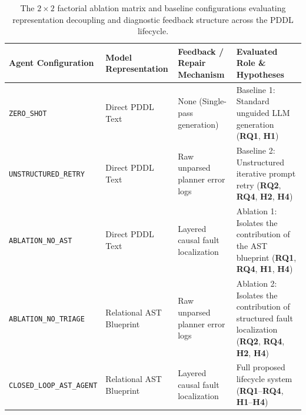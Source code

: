 \documentclass[11pt,a4paper]{article}
\begin{document}
\begin{table}[H]
\centering
\footnotesize
\renewcommand{\arraystretch}{1.1}
\begin{tabularx}{\textwidth}{l p{3.2cm} p{3.8cm} X}
\toprule
\textbf{Agent Configuration} & \textbf{Model Representation} & \textbf{Feedback / Repair Mechanism} & \textbf{Evaluated Role \& Hypotheses} \\
\midrule
\texttt{ZERO\_SHOT} & Direct PDDL Text & None (Single-pass generation) & Baseline 1: Standard unguided LLM generation (\textbf{RQ1}, \textbf{H1}) \\
\texttt{UNSTRUCTURED\_RETRY} & Direct PDDL Text & Raw unparsed planner error logs & Baseline 2: Unstructured iterative prompt retry (\textbf{RQ2}, \textbf{RQ4}, \textbf{H2}, \textbf{H4}) \\
\texttt{ABLATION\_NO\_AST} & Direct PDDL Text & Layered causal fault localization & Ablation 1: Isolates the contribution of the AST blueprint (\textbf{RQ1}, \textbf{RQ4}, \textbf{H1}, \textbf{H4}) \\
\texttt{ABLATION\_NO\_TRIAGE} & Relational AST Blueprint & Raw unparsed planner error logs & Ablation 2: Isolates the contribution of structured fault localization (\textbf{RQ2}, \textbf{RQ4}, \textbf{H2}, \textbf{H4}) \\
\texttt{CLOSED\_LOOP\_AST\_AGENT} & Relational AST Blueprint & Layered causal fault localization & Full proposed lifecycle system (\textbf{RQ1}--\textbf{RQ4}, \textbf{H1}--\textbf{H4}) \\
\bottomrule
\end{tabularx}
\caption{The $2 \times 2$ factorial ablation matrix and baseline configurations evaluating representation decoupling and diagnostic feedback structure across the PDDL lifecycle.}
\label{tab:factorial_agent_matrix}
\end{table}
\end{document}
